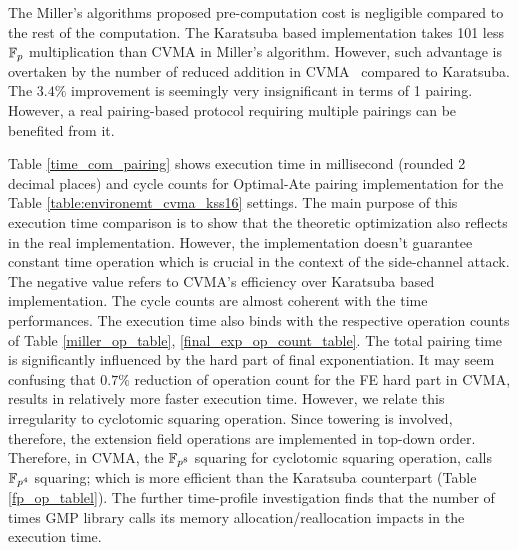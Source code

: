 The Miller's algorithms proposed pre-computation cost is negligible compared to the rest of the computation.
The Karatsuba based implementation takes 101 less ${\mathbb{F}}_{p}$ multiplication than CVMA in Miller's algorithm.
However, such advantage is overtaken by the number of reduced addition in CVMA~ compared to Karatsuba.
The $3.4\%$ improvement is seemingly very insignificant in terms of 1 pairing. 
However, a real pairing-based protocol requiring multiple pairings can be benefited from it.

Table \ref{time_com_pairing} shows  execution time in millisecond (rounded 2 decimal places) and cycle counts for Optimal-Ate pairing implementation for the Table \ref{table:environemt_cvma_kss16} settings. 
The main purpose of this execution time comparison is to show that the theoretic optimization also reflects in the real implementation.
However, the implementation doesn't guarantee constant time operation which is crucial in the context of the side-channel attack.
The negative value refers to CVMA's efficiency over Karatsuba based implementation. 
The cycle counts are almost coherent with the time performances.
The execution time  also binds with the respective operation counts of Table \ref{miller_op_table}, \ref{final_exp_op_count_table}.
The total pairing time is significantly influenced by the hard part of final exponentiation. 
It may seem confusing that $0.7\%$ reduction of operation count for the FE hard part in CVMA, results in  relatively more faster execution time.
However, we relate this irregularity to cyclotomic squaring operation.
Since towering is involved, therefore, the extension field operations are implemented in top-down order.
Therefore, in CVMA, the $\mathbb{F}_{p^{8}}$ squaring for cyclotomic squaring operation, calls $\mathbb{F}_{p^4}$ squaring; which is more efficient than the Karatsuba counterpart (Table \ref{fp_op_tablel}).
The further time-profile investigation finds that  the number of times GMP library calls its  memory allocation/reallocation impacts in the execution time.

